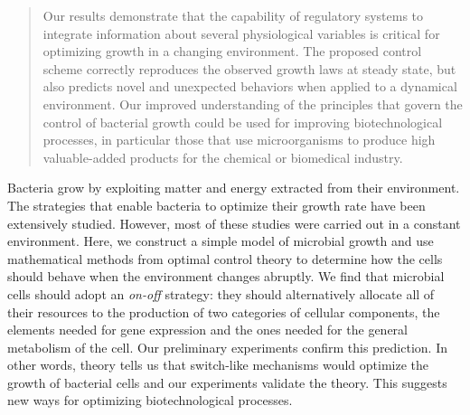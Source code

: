 \begin{abstract}
Our results demonstrate that the capability of regulatory systems to integrate information about several physiological variables is critical for optimizing growth in a changing environment.
The proposed control scheme correctly reproduces the observed growth laws at steady state, but also predicts novel and unexpected behaviors when applied to a dynamical environment.
Our improved understanding of the principles that govern the control of bacterial growth could be used for improving biotechnological processes, in particular those that use microorganisms to produce high valuable-added products for the chemical or biomedical industry.
\end{abstract}


\begin{author-summary}
Bacteria grow by exploiting matter and energy extracted from their environment.
The strategies that enable bacteria to optimize their growth rate have been extensively studied.
However, most of these studies were carried out in a constant environment.
Here, we construct a simple model of microbial growth and use mathematical methods from optimal control theory to determine how the cells should behave when the environment changes abruptly.
We find that microbial cells should adopt an \textit{on-off} strategy:
they should alternatively allocate all of their resources to the production of two categories of cellular components, the elements needed for gene expression and the ones needed for the general metabolism of the cell.
Our preliminary experiments confirm this prediction.
In other words, theory tells us that switch-like mechanisms would optimize the growth of bacterial cells and our experiments validate the theory.
This suggests new ways for optimizing biotechnological processes.
\end{author-summary}

